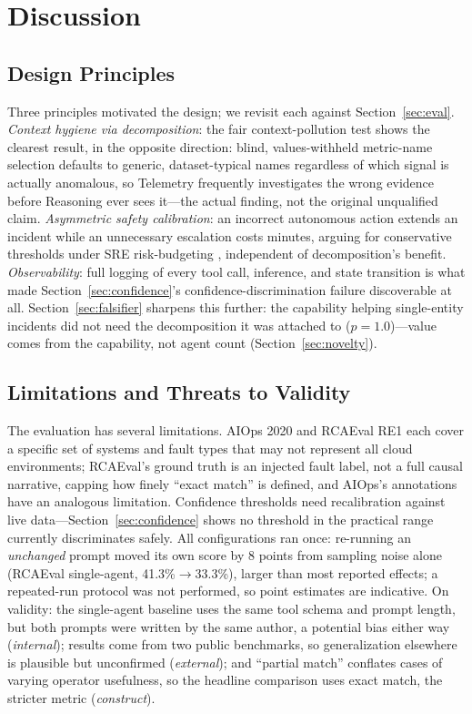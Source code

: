 \documentclass[10pt,conference]{IEEEtran}
\begin{document}
\section{Discussion}
\label{sec:discussion}

\subsection{Design Principles}
Three principles motivated the design; we revisit each against
Section~\ref{sec:eval}. \emph{Context hygiene via decomposition}: the fair
context-pollution test shows the clearest result, in the opposite
direction: blind, values-withheld metric-name selection defaults to
generic, dataset-typical names regardless of which signal is actually
anomalous, so Telemetry frequently investigates the wrong evidence before
Reasoning ever sees it---the actual finding, not the original unqualified
claim. \emph{Asymmetric safety calibration}: an incorrect autonomous
action extends an incident while an unnecessary escalation costs minutes,
arguing for conservative thresholds under SRE risk-budgeting
\cite{murphy2016embracingrisk}, independent of decomposition's benefit.
\emph{Observability}: full logging of every tool call, inference, and
state transition is what made Section~\ref{sec:confidence}'s
confidence-discrimination failure discoverable at all.
Section~\ref{sec:falsifier} sharpens this further: the capability helping
single-entity incidents did not need the decomposition it was attached to
($p=1.0$)---value comes from the capability, not agent count
(Section~\ref{sec:novelty}).

\subsection{Limitations and Threats to Validity}
The evaluation has several limitations. AIOps 2020 and RCAEval RE1 each
cover a specific set of systems and fault types that may not represent all
cloud environments; RCAEval's ground truth is an injected fault label, not
a full causal narrative, capping how finely ``exact match'' is defined,
and AIOps's annotations have an analogous limitation. Confidence
thresholds need recalibration against live data---Section~\ref{sec:confidence}
shows no threshold in the practical range currently discriminates safely.
All configurations ran once: re-running an \emph{unchanged} prompt moved
its own score by 8 points from sampling noise alone (RCAEval single-agent,
41.3\%$\to$33.3\%), larger than most reported effects; a repeated-run
protocol was not performed, so point estimates are indicative. On validity: the single-agent baseline uses the same tool
schema and prompt length, but both prompts were written by the same
author, a potential bias either way (\emph{internal}); results come from
two public benchmarks, so generalization elsewhere is plausible but
unconfirmed (\emph{external}); and ``partial match'' conflates cases of
varying operator usefulness, so the headline comparison uses exact match,
the stricter metric (\emph{construct}).
\end{document}
